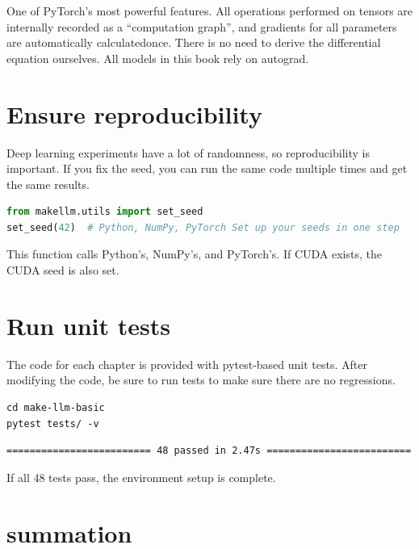 \begin{infobox}[Autograd]
One of PyTorch's most powerful features. All operations performed on tensors are internally recorded as a ``computation graph'', and gradients for all parameters are automatically calculatedonce. There is no need to derive the differential equation ourselves. All models in this book rely on autograd.
\end{infobox}

\section{Ensure reproducibility}

Deep learning experiments have a lot of randomness, so reproducibility is important. If you fix the seed, you can run the same code multiple times and get the same results.

\begin{lstlisting}[language=Python]
from makellm.utils import set_seed
set_seed(42)  # Python, NumPy, PyTorch Set up your seeds in one step
\end{lstlisting}

This function calls Python's, NumPy's, and PyTorch's. If CUDA exists, the CUDA seed is also set.

\section{Run unit tests}

The code for each chapter is provided with pytest-based unit tests. After modifying the code, be sure to run tests to make sure there are no regressions.

\begin{lstlisting}[style=bashstyle]
cd make-llm-basic
pytest tests/ -v
\end{lstlisting}

\begin{lstlisting}[style=bashstyle, basicstyle=\ttfamily\small]
========================= 48 passed in 2.47s =========================
\end{lstlisting}

If all 48 tests pass, the environment setup is complete.

\section{summation}

